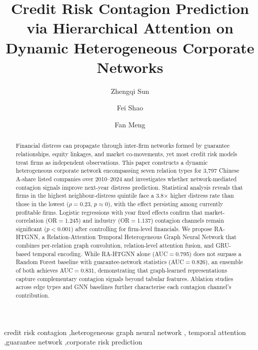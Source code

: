 \documentclass[3p,times,procedia]{elsarticle}
\begin{document}
\begin{frontmatter}


\title{Credit Risk Contagion Prediction via Hierarchical Attention on
       Dynamic Heterogeneous Corporate Networks}

\author[pku]{Zhengqi Sun}

\author[pku]{Fei Shao}

\author[pku]{Fan Meng}

\address[pku]{Department of Information Management, Peking University, Beijing 100871, China}

\begin{abstract}
Financial distress can propagate through inter-firm networks formed by guarantee relationships, equity linkages, and market co-movements, yet most credit risk models treat firms as independent observations.
This paper constructs a dynamic heterogeneous corporate network encompassing seven relation types for 3{,}797 Chinese A-share listed companies over 2010--2024 and investigates whether network-mediated contagion signals improve next-year distress prediction.
Statistical analysis reveals that firms in the highest neighbour-distress quintile face a 3.8$\times$ higher distress rate than those in the lowest ($\rho=0.23$, $p\approx 0$), with the effect persisting among currently profitable firms.
Logistic regressions with year fixed effects confirm that market-correlation (OR$=$1.245) and industry (OR$=$1.137) contagion channels remain significant ($p<0.001$) after controlling for firm-level financials.
We propose RA-HTGNN, a Relation-Attention Temporal Heterogeneous Graph Neural Network that combines per-relation graph convolution, relation-level attention fusion, and GRU-based temporal encoding.
While RA-HTGNN alone (AUC$=$0.795) does not surpass a Random Forest baseline with guarantee-network statistics (AUC$=$0.826), an ensemble of both achieves AUC$=$0.831, demonstrating that graph-learned representations capture complementary contagion signals beyond tabular features.
Ablation studies across edge types and GNN baselines further characterise each contagion channel's contribution.
\end{abstract}

\begin{keyword}
credit risk contagion \sep heterogeneous graph neural network \sep
temporal attention \sep guarantee network \sep corporate risk prediction
\end{keyword}

\end{frontmatter}
\end{document}

